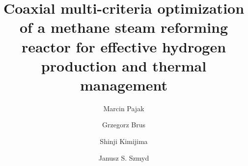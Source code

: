 \documentclass[preprint,12pt]{elsarticle}
\begin{document}
\begin{frontmatter}


\title{Coaxial multi-criteria optimization of a methane steam reforming reactor for effective hydrogen production and thermal management}



\author[affiliationA]{Marcin Pajak}

\author[affiliationA]{Grzegorz Brus}

\author[affiliationB]{Shinji Kimijima}

\author[affiliationA]{Janusz S. Szmyd}




\end{frontmatter}
\end{document}
